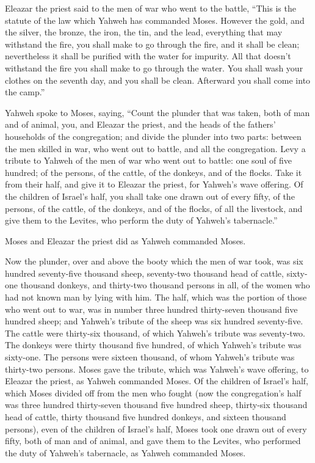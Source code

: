  Eleazar the priest said to the men of war who went to the
battle, ``This is the statute of the law which Yahweh has commanded
Moses.  However the gold, and the silver, the bronze, the
iron, the tin, and the lead,  everything that may withstand
the fire, you shall make to go through the fire, and it shall be clean;
nevertheless it shall be purified with the water for impurity. All that
doesn't withstand the fire you shall make to go through the water.
 You shall wash your clothes on the seventh day, and you
shall be clean. Afterward you shall come into the camp.''

 Yahweh spoke to Moses, saying,  ``Count the
plunder that was taken, both of man and of animal, you, and Eleazar the
priest, and the heads of the fathers' households of the congregation;
 and divide the plunder into two parts: between the men
skilled in war, who went out to battle, and all the congregation.
 Levy a tribute to Yahweh of the men of war who went out to
battle: one soul of five hundred; of the persons, of the cattle, of the
donkeys, and of the flocks.  Take it from their half, and
give it to Eleazar the priest, for Yahweh's wave offering. 
Of the children of Israel's half, you shall take one drawn out of every
fifty, of the persons, of the cattle, of the donkeys, and of the flocks,
of all the livestock, and give them to the Levites, who perform the duty
of Yahweh's tabernacle.''

 Moses and Eleazar the priest did as Yahweh commanded
Moses.

 Now the plunder, over and above the booty which the men of
war took, was six hundred seventy-five thousand sheep, 
seventy-two thousand head of cattle,  sixty-one thousand
donkeys,  and thirty-two thousand persons in all, of the
women who had not known man by lying with him.  The half,
which was the portion of those who went out to war, was in number three
hundred thirty-seven thousand five hundred sheep;  and
Yahweh's tribute of the sheep was six hundred seventy-five.
 The cattle were thirty-six thousand, of which Yahweh's
tribute was seventy-two.  The donkeys were thirty thousand
five hundred, of which Yahweh's tribute was sixty-one.  The
persons were sixteen thousand, of whom Yahweh's tribute was thirty-two
persons.  Moses gave the tribute, which was Yahweh's wave
offering, to Eleazar the priest, as Yahweh commanded Moses.
 Of the children of Israel's half, which Moses divided off
from the men who fought  (now the congregation's half was
three hundred thirty-seven thousand five hundred sheep, 
thirty-six thousand head of cattle,  thirty thousand five
hundred donkeys,  and sixteen thousand persons),
 even of the children of Israel's half, Moses took one
drawn out of every fifty, both of man and of animal, and gave them to
the Levites, who performed the duty of Yahweh's tabernacle, as Yahweh
commanded Moses.

